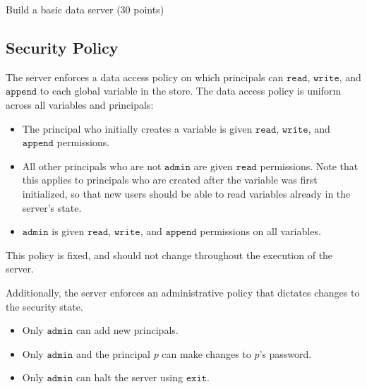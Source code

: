 \documentclass[11pt]{article}
\begin{document}
\begin{problem}{Build a basic data server (30 points)}
\subsection*{Security Policy} The server enforces a data access policy on which principals can $\mathtt{read}$, $\mathtt{write}$, and $\mathtt{append}$ to each global variable in the store. The data access policy is uniform across all variables and principals:
\begin{itemize}
\item The principal who initially creates a variable is given $\mathtt{read}$, $\mathtt{write}$, and $\mathtt{append}$ permissions.
\item All other principals who are not $\mathtt{admin}$ are given $\mathtt{read}$ permissions. Note that this applies to principals who are created after the variable was first initialized, so that new users should be able to read variables already in the server's state.
\item $\mathtt{admin}$ is given $\mathtt{read}$, $\mathtt{write}$, and $\mathtt{append}$ permissions on all variables.
\end{itemize}
This policy is fixed, and should not change throughout the execution of the server.

Additionally, the server enforces an administrative policy that dictates changes to the security state.
\begin{itemize}
\item Only $\mathtt{admin}$ can add new principals.
\item Only $\mathtt{admin}$ and the principal $p$ can make changes to $p$'s password.
\item Only $\mathtt{admin}$ can halt the server using $\mathtt{exit}$.
\end{itemize}


\end{problem}
\end{document}
